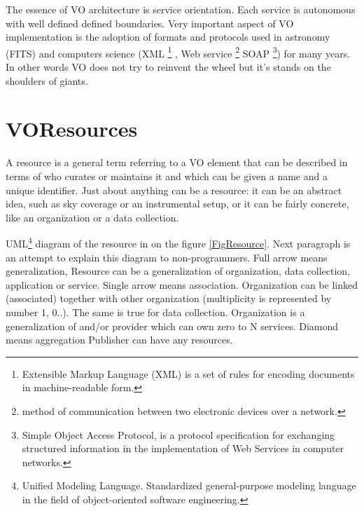 \clearpage

The essence of VO architecture is service orientation. Each service is
autonomous with well defined defined boundaries. Very important aspect
of VO implementation is the adoption of formats and protocols used in
astronomy (FITS) and computers science (XML \footnote{Extensible
  Markup Language (XML) is a set of rules for encoding documents in
  machine-readable form.} , Web service \footnote{method of
  communication between two electronic devices over a network.} SOAP
\footnote{Simple Object Access Protocol, is a protocol specification
  for exchanging structured information in the implementation of Web
  Services in computer networks.}) for many years. In other words VO
does not try to reinvent the wheel but it's stands on the shoulders of
giants.


\section{VOResources}

A resource is a general term referring to a VO element that can be
described in terms of who curates or maintains it and which can be
given a name and a unique identifier. Just about anything can be a
resource: it can be an abstract idea, such as sky coverage or an
instrumental setup, or it can be fairly concrete, like an organization
or a data collection. \cite{bensonivoa}

UML\footnote{Unified Modeling Language. Standardized general-purpose
  modeling language in the field of object-oriented software
  engineering.}  diagram of the resource in on the figure
\ref{FigResource}. Next paragraph is an attempt to explain this
diagram to non-programmers. Full arrow means generalization, Resource
can be a generalization of organization, data collection, application
or service. Single arrow means association. Organization can be linked
(associated) together with other organization (multiplicity is
represented by number 1, 0..). The same is true for data
collection. Organization is a generalization of and/or provider which
can own zero to N services. Diamond means aggregation Publisher can
have any resources.
  
